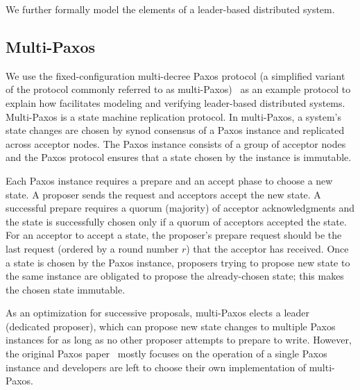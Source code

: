We further formally model the elements of a leader-based distributed system.

\subsection{Multi-Paxos}

We use the fixed-configuration multi-decree Paxos protocol (a simplified variant
of the protocol commonly referred to as multi-Paxos)~\cite{rvrpaxos}
as an example protocol to explain how \sysname{} facilitates modeling and
verifying leader-based distributed systems. Multi-Paxos is a
state machine replication protocol. In multi-Paxos, a system's state changes
are chosen by synod consensus of a Paxos instance and replicated across acceptor nodes.
The Paxos instance consists of a group of acceptor nodes and the Paxos protocol
ensures that a state chosen by the instance is immutable.

Each Paxos instance requires a prepare and an accept phase to choose a new
state. A proposer sends the request and acceptors accept the new state.
A successful prepare requires a quorum (majority) of acceptor acknowledgments
and the state is successfully chosen only if a quorum of acceptors
accepted the state. For an acceptor to accept a state, the proposer's prepare
request should be the last request (ordered by a round number $r$)
that the acceptor has received. Once a state is chosen by the Paxos instance,
proposers trying to propose new state to the same instance are obligated to
propose the already-chosen state; this makes the chosen state immutable.

As an optimization for successive proposals, multi-Paxos elects a
leader (dedicated proposer), which can propose new state changes to multiple Paxos
instances for as long as no other proposer attempts to prepare to write. However, the
original Paxos paper~\cite{paxos, paxosmadesimple} mostly focuses on the operation
of a single Paxos instance
and developers are left to choose their own implementation of multi-Paxos.

